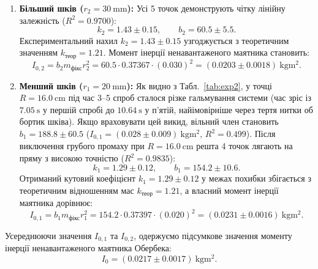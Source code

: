 \documentclass[ukrainian]{ucaphyslab}
\begin{document}
\begin{enumerate}
  \item \textbf{Більший шків ($r_2 = \SI{30}{\milli\meter}$):} Усі 5 точок демонструють чітку лінійну залежність ($R^2 = 0.9700$):
  \begin{equation*}
    k_2 = \num{1.43} \pm \num{0.15}, \qquad b_2 = \num{60.5} \pm \num{5.5}.
  \end{equation*}
  Експериментальний нахил $k_2 = 1.43 \pm 0.15$ узгоджується з теоретичним значенням $k_{\text{теор}} = 1.21$. Момент інерції ненавантаженого маятника становить:
  \begin{equation}
    I_{0,2} = b_2 m_{\text{фікс}} r_2^2 = \num{60.5} \cdot \num{0.37367} \cdot (\num{0.030})^2 = (\num{0.0203} \pm \num{0.0018})\ \si{\kilogram\meter\squared}.
  \end{equation}

  \item \textbf{Менший шків ($r_1 = \SI{20}{\milli\meter}$):} Як видно з Табл.~\ref{tab:exp2}, у точці $R = \SI{16.0}{\centi\meter}$ під час 3--5 спроб сталося різке гальмування системи (час зріс із $\SI{7.05}{\second}$ у першій спробі до $\SI{10.64}{\second}$ у п'ятій, найімовірніше через тертя нитки об бортик шківа). Якщо враховувати цей викид, вільний член становить $b_1 = 188.8 \pm 60.5$ ($I_{0,1} = (\num{0.028} \pm \num{0.009})\ \si{\kilogram\meter\squared}$, $R^2 = 0.499$). Після виключення грубого промаху при $R = \SI{16.0}{\centi\meter}$ решта 4 точок лягають на пряму з високою точністю ($R^2 = 0.9835$):
  \begin{equation*}
    k_1 = \num{1.29} \pm \num{0.12}, \qquad b_1 = \num{154.2} \pm \num{10.6}.
  \end{equation*}
  Отриманий кутовий коефіцієнт $k_1 = 1.29 \pm 0.12$ у межах похибки збігається з теоретичним відношенням мас $k_{\text{теор}} = 1.21$, а власний момент інерції маятника дорівнює:
  \begin{equation}
    I_{0,1} = b_1 m_{\text{фікс}} r_1^2 = \num{154.2} \cdot \num{0.37397} \cdot (\num{0.020})^2 = (\num{0.0231} \pm \num{0.0016})\ \si{\kilogram\meter\squared}.
  \end{equation}
\end{enumerate}

Усереднюючи значення $I_{0,1}$ та $I_{0,2}$, одержуємо підсумкове значення моменту інерції ненавантаженого маятника Обербека:
\begin{equation}
  I_0 = (\num{0.0217} \pm \num{0.0017})\ \si{\kilogram\meter\squared}.
\end{equation}
\end{document}
